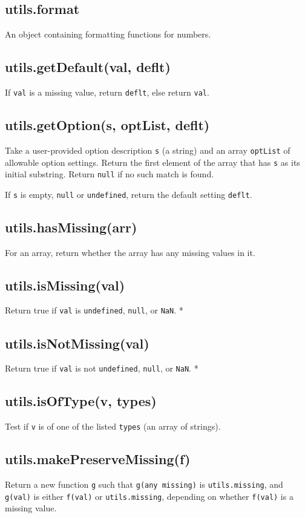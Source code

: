 \documentclass{article}
\begin{document}
    \subsection{utils.format}
    An object containing formatting functions for numbers.


    \subsection{utils.getDefault(val, deflt)}
    If \texttt{val} is a missing value, return \texttt{deflt}, else return \texttt{val}.


    \subsection{utils.getOption(s, optList, deflt)}
    Take a user-provided option description \texttt{s} (a string) and an array \texttt{optList}
of allowable option settings.  Return the first element of the array that
has \texttt{s} as its initial substring.  Return \texttt{null} if no such match is found.


If \texttt{s} is empty, \texttt{null} or \texttt{undefined}, return the default setting \texttt{deflt}.


    \subsection{utils.hasMissing(arr)}
    For an array, return whether the array has any missing values in it.


    \subsection{utils.isMissing(val)}
    Return true if \texttt{val} is \texttt{undefined}, \texttt{null}, or \texttt{NaN}. *


    \subsection{utils.isNotMissing(val)}
    Return true if \texttt{val} is not \texttt{undefined}, \texttt{null}, or \texttt{NaN}. *


    \subsection{utils.isOfType(v, types)}
    Test if \texttt{v} is of one of the listed \texttt{types} (an array of strings).


    \subsection{utils.makePreserveMissing(f)}
    Return a new function \texttt{g} such that \texttt{g(any missing)} is \texttt{utils.missing},
and \texttt{g(val)} is either \texttt{f(val)} or \texttt{utils.missing}, depending on whether
\texttt{f(val)} is a missing value.
\end{document}
